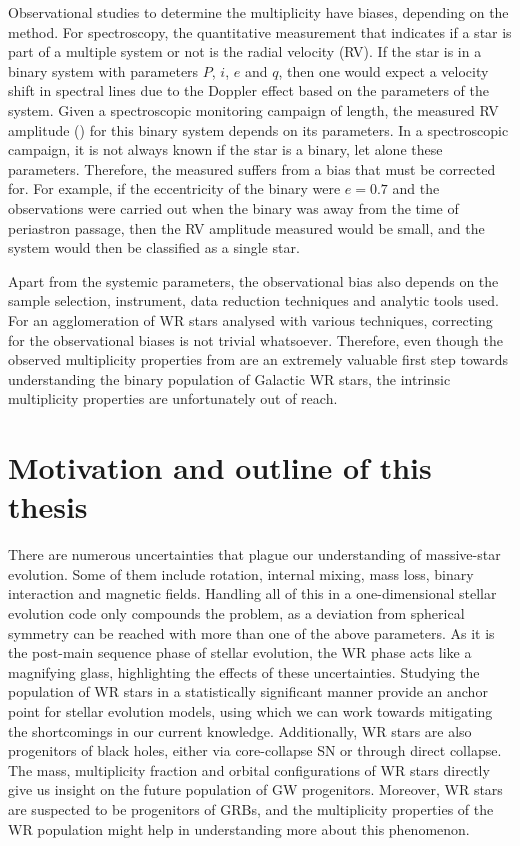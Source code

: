 Observational studies to determine the multiplicity have biases, depending on the method. For spectroscopy, the quantitative measurement that indicates if a star is part of a multiple system or not is the radial velocity (RV). If the star is in a binary system with parameters $P$, $i$, $e$ and $q$, then one would expect a velocity shift in spectral lines due to the Doppler effect based on the parameters of the system. Given a spectroscopic monitoring campaign of length, the measured RV amplitude (\DelRV{}) for this binary system depends on its parameters. In a spectroscopic campaign, it is not always known if the star is a binary, let alone these parameters. Therefore, the measured \DelRV{} suffers from a bias that must be corrected for. For example, if the eccentricity of the binary were $e=0.7$ and the observations were carried out when the binary was away from the time of periastron passage, then the RV amplitude measured would be small, and the system would then be classified as a single star.

Apart from the systemic parameters, the observational bias also depends on the sample selection, instrument, data reduction techniques and analytic tools used. For an agglomeration of WR stars analysed with various techniques, correcting for the observational biases is not trivial whatsoever. Therefore, even though the observed multiplicity properties from  are an extremely valuable first step towards understanding the binary population of Galactic WR stars, the intrinsic multiplicity properties are unfortunately out of reach. 

\section{Motivation and outline of this thesis}

There are numerous uncertainties that plague our understanding of massive-star evolution. Some of them include rotation, internal mixing, mass loss, binary interaction and magnetic fields. Handling all of this in a one-dimensional stellar evolution code only compounds the problem, as a deviation from spherical symmetry can be reached with more than one of the above parameters. As it is the post-main sequence phase of stellar evolution, the WR phase acts like a magnifying glass, highlighting the effects of these uncertainties. Studying the population of WR stars in a statistically significant manner provide an anchor point for stellar evolution models, using which we can work towards mitigating the shortcomings in our current knowledge. Additionally, WR stars are also progenitors of black holes, either via core-collapse SN or through direct collapse. The mass, multiplicity fraction and orbital configurations of WR stars directly give us insight on the future population of GW progenitors. Moreover, WR stars are suspected to be progenitors of GRBs, and the multiplicity properties of the WR population might help in understanding more about this phenomenon. 

